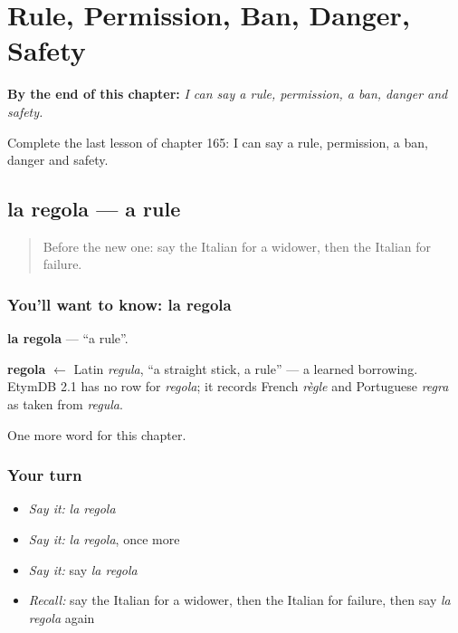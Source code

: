 
\chapter{Rule, Permission, Ban, Danger, Safety}
\label{ch:it-rule-permission-ban-danger-safety}

\begin{chapteropening}
\textbf{By the end of this chapter:} \emph{I can say a rule, permission, a ban, danger and safety.}

Complete the last lesson of chapter 165: I can say a rule, permission, a ban, danger and safety.
\end{chapteropening}

\section[la regola]{la regola — a rule}

\label{lesson:IT-C165-regola}



\begin{quote}
Before the new one: say the Italian for a widower, then the Italian for failure.
\end{quote}

\subsection*{You'll want to know: la regola}
\textbf{la regola} — \textquotedblleft{}a rule\textquotedblright{}.

\begin{cousinweb}
\textbf{regola} $\leftarrow$ Latin \emph{regula}, \textquotedblleft{}a straight stick, a rule\textquotedblright{} — a learned borrowing. EtymDB 2.1 has no row for \emph{regola}; it records French \emph{règle} and Portuguese \emph{regra} as taken from \emph{regula}.
\end{cousinweb}

\begin{grammarlens}[title={What you've built}]
One more word for this chapter.
\end{grammarlens}

\subsection*{Your turn}
\begin{itemize}
\raggedright
  \item \emph{Say it:} \emph{la regola}
  \item \emph{Say it:} \emph{la regola}, once more
  \item \emph{Say it:} say \emph{la regola}
  \item \emph{Recall:} say the Italian for a widower, then the Italian for failure, then say \emph{la regola} again
\end{itemize}

